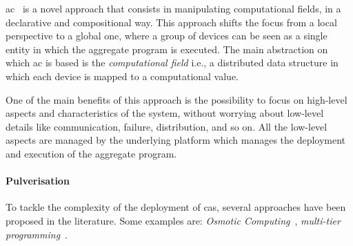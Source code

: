 \documentclass[12pt]{article}
\begin{document}
\ac{ac}~\cite{DBLP:journals/computer/BealPV15} is a novel approach that consists in manipulating computational fields,
in a declarative and compositional way.
%
This approach shifts the focus from a local perspective to a global one,
where a group of devices can be seen as a single entity in which the aggregate program is executed.
%
The main abstraction on which \ac{ac} is based is the \emph{computational field} i.e.,
a distributed data structure in which each device is mapped to a computational value.

One of the main benefits of this approach is the possibility to focus on high-level aspects and characteristics of the system,
without worrying about low-level details like communication, failure, distribution, and so on.
%
All the low-level aspects are managed by the underlying platform which manages the deployment and execution of the aggregate program.

\paragraph{Pulverisation}
To tackle the complexity of the deployment of \ac{cas},
several approaches have been proposed in the literature.
%
Some examples are: \emph{Osmotic Computing}~\cite{DBLP:journals/tiot/NehaPSSG22}, \emph{multi-tier programming}~\cite{DBLP:journals/csur/WeisenburgerWS20}.
\end{document}
